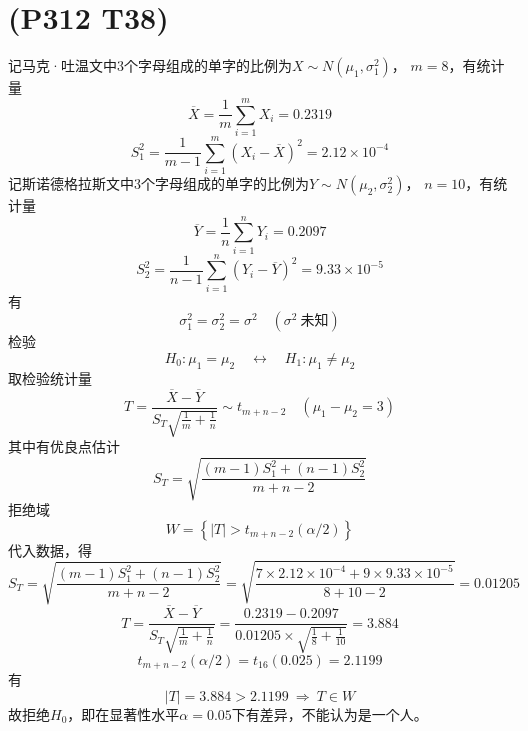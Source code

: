 \documentclass{article}
\begin{document}
\section{(P312 T38)}  %
    记马克·吐温文中3个字母组成的单字的比例为$X\sim N(\mu_1, \sigma_1^2)$，
    $m = 8$，有统计量
    \[
        \overline{X} = \frac{1}{m} \sum\limits_{i=1}^{m} X_i = 0.2319
    \]
    \[
        S_1^2 
        = \frac{1}{m-1} \sum\limits_{i=1}^{m} {\left(X_i - \overline{X}\right)}^2
        = 2.12 \times 10^{-4}
    \]
    记斯诺德格拉斯文中3个字母组成的单字的比例为$Y\sim N(\mu_2, \sigma_2^2)$，
    $n = 10$，有统计量
    \[
        \overline{Y} = \frac{1}{n} \sum\limits_{i=1}^{n} Y_i = 0.2097
    \]
    \[
        S_2^2 
        = \frac{1}{n-1} \sum\limits_{i=1}^{n} {\left(Y_i - \overline{Y}\right)}^2
        = 9.33 \times 10^{-5}
    \]
    有
    \[
        \sigma_1^2 = \sigma_2^2 = \sigma^2 \quad (\sigma^2\ \mbox{未知})  
    \]
    检验
    \[
        H_0 : \mu_1 = \mu_2 
        \quad \leftrightarrow \quad
        H_1 : \mu_1 \neq \mu_2         
    \]
    取检验统计量
    \[
        T = \frac{\overline{X} - \overline{Y}}
        {S_T \sqrt{\frac{1}{m} + \frac{1}{n}}}    
        \sim t_{m+n-2}
        \quad (\mu_1 - \mu_2 = 3)
    \]
    其中有优良点估计
    \[
        S_T = \sqrt{\frac{(m-1) S_1^2 + (n-1) S_2^2}{m+n-2}}    
    \]
    拒绝域
    \[
        W = 
        \left\{
            |T| > t_{m+n-2} (\alpha / 2)
        \right\}    
    \]
    代入数据，得
    \[
        S_T 
        = \sqrt{\frac{(m-1) S_1^2 + (n-1) S_2^2}{m+n-2}}  
        = \sqrt{\frac{7\times 2.12\times 10^{-4} + 9\times 9.33\times 10^{-5}}{8+10-2}}
        = 0.01205
    \]
    \[
        T
        = \frac{\overline{X} - \overline{Y}}{S_T \sqrt{\frac{1}{m} + \frac{1}{n}}}     
        = \frac{0.2319 - 0.2097}{0.01205 \times \sqrt{\frac{1}{8} + \frac{1}{10}}}
        = 3.884
    \]
    \[
        t_{m+n-2}(\alpha /2 ) 
        = t_{16}(0.025)
        = 2.1199
    \]
    有
    \[
        |T| = 3.884 > 2.1199
        \ \Rightarrow\ 
        T \in W    
    \]
    故拒绝$H_0$，即在显著性水平$\alpha = 0.05$下有差异，不能认为是一个人。
\end{document}
